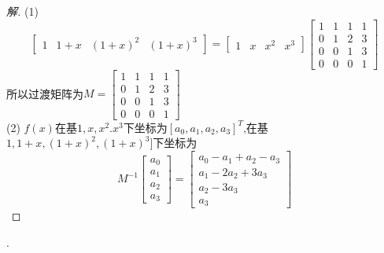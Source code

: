 \documentclass[10pt,a4paper]{report}
\begin{document}
\begin{proof}[解]
	(1)
	$$\left[
	\begin{matrix}
	1 & 1+x & (1+x)^{2} & (1+x)^{3}
	\end{matrix}
	\right] = \left[
	\begin{matrix}
	1 & x & x^{2} & x^{3}
	\end{matrix}
	\right]
	\left[
	\begin{matrix}
	1 & 1 & 1 & 1\\
	0 & 1 & 2 & 3\\
	0 & 0 & 1 & 3\\
	0 & 0 & 0 & 1
	\end{matrix}
	\right]$$
	所以过渡矩阵为$M=\left[
	\begin{matrix}
	1 & 1 & 1 & 1\\
	0 & 1 & 2 & 3\\
	0 & 0 & 1 & 3\\
	0 & 0 & 0 & 1
	\end{matrix}
	\right]$\\
	(2)
	$f(x)$在基$1,x,x^{2}.x^{3}$下坐标为$[a_{0},a_{1},a_{2},a_{3}]^{T}$,在基$1,1+x,(1+x)^{2},(1+x)^{3}]$下坐标为
	$$M^{-1}\left[
	\begin{matrix}
	a_{0}\\
	a_{1}\\
	a_{2}\\
	a_{3}
	\end{matrix}
	\right] = \left[
	\begin{matrix}
	a_{0}-a_{1}+a_{2}-a_{3}\\
	a_{1}-2a_{2}+3a_{3}\\
	a_{2}-3a_{3}\\
	a_{3}
	\end{matrix}
	\right]$$
\end{proof}
.
\end{document}
